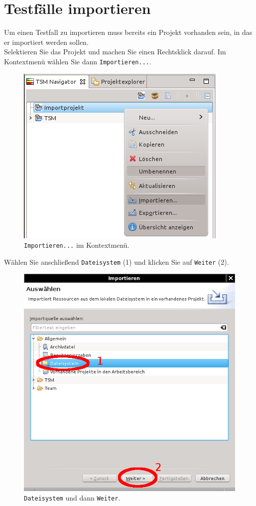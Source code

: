 \documentclass[11pt,a4paper,titlepage]{article}
\begin{document}
\section{Testfälle importieren}
Um einen Testfall zu importieren muss bereits ein Projekt vorhanden sein, in das er importiert werden sollen.\\
Selektieren Sie das Projekt und machen Sie einen Rechtsklick darauf. Im Kontextmenü wählen Sie dann \texttt{Importieren...}.
\begin{figure}[H]
 \centering
 \includegraphics{./ImportierenExportieren/kontextmenue-imp.png}
 \caption{\texttt{Importieren...} im Kontextmenü.}
 \label{abb:Kontextmenue-imp}
\end{figure}
\vspace{\baselineskip}
Wählen Sie anschließend \texttt{Dateisystem} (1) und klicken Sie auf \texttt{Weiter} (2).
\begin{figure}[H]
 \centering
 \includegraphics{./ImportierenExportieren/assistent-imp1.png}
 \caption{\texttt{Dateisystem} und dann \texttt{Weiter}.}
 \label{abb:Assistent-imp1}
\end{figure}
\end{document}
